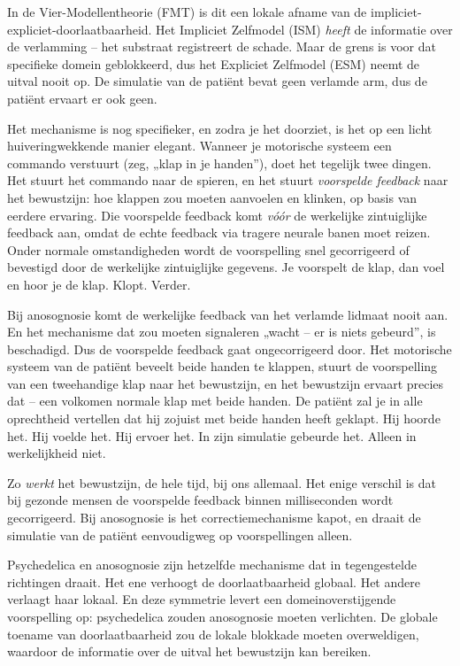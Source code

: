 \documentclass[11pt, twoside, openright]{book}
\begin{document}
In de Vier-Modellentheorie (FMT) is dit een lokale afname van de impliciet-expliciet-doorlaatbaarheid. Het Impliciet Zelfmodel (ISM) \textit{heeft} de informatie over de verlamming -- het substraat registreert de schade. Maar de grens is voor dat specifieke domein geblokkeerd, dus het Expliciet Zelfmodel (ESM) neemt de uitval nooit op. De simulatie van de patiënt bevat geen verlamde arm, dus de patiënt ervaart er ook geen.

Het mechanisme is nog specifieker, en zodra je het doorziet, is het op een licht huiveringwekkende manier elegant. Wanneer je motorische systeem een commando verstuurt (zeg, „klap in je handen”), doet het tegelijk twee dingen. Het stuurt het commando naar de spieren, en het stuurt \textit{voorspelde feedback} naar het bewustzijn: hoe klappen zou moeten aanvoelen en klinken, op basis van eerdere ervaring. Die voorspelde feedback komt \textit{vóór} de werkelijke zintuiglijke feedback aan, omdat de echte feedback via tragere neurale banen moet reizen. Onder normale omstandigheden wordt de voorspelling snel gecorrigeerd of bevestigd door de werkelijke zintuiglijke gegevens. Je voorspelt de klap, dan voel en hoor je de klap. Klopt. Verder.

Bij anosognosie komt de werkelijke feedback van het verlamde lidmaat nooit aan. En het mechanisme dat zou moeten signaleren „wacht -- er is niets gebeurd”, is beschadigd. Dus de voorspelde feedback gaat ongecorrigeerd door. Het motorische systeem van de patiënt beveelt beide handen te klappen, stuurt de voorspelling van een tweehandige klap naar het bewustzijn, en het bewustzijn ervaart precies dat -- een volkomen normale klap met beide handen. De patiënt zal je in alle oprechtheid vertellen dat hij zojuist met beide handen heeft geklapt. Hij hoorde het. Hij voelde het. Hij ervoer het. In zijn simulatie gebeurde het. Alleen in werkelijkheid niet.

Zo \textit{werkt} het bewustzijn, de hele tijd, bij ons allemaal. Het enige verschil is dat bij gezonde mensen de voorspelde feedback binnen milliseconden wordt gecorrigeerd. Bij anosognosie is het correctiemechanisme kapot, en draait de simulatie van de patiënt eenvoudigweg op voorspellingen alleen.

Psychedelica en anosognosie zijn hetzelfde mechanisme dat in tegengestelde richtingen draait. Het ene verhoogt de doorlaatbaarheid globaal. Het andere verlaagt haar lokaal. En deze symmetrie levert een domeinoverstijgende voorspelling op: psychedelica zouden anosognosie moeten verlichten. De globale toename van doorlaatbaarheid zou de lokale blokkade moeten overweldigen, waardoor de informatie over de uitval het bewustzijn kan bereiken.
\end{document}
